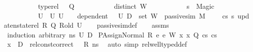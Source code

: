 \begin{isabellebody}
\ \ \ \ \ \ \ \ \ \ {\isachardoublequoteopen}type{\isacharunderscore}{\kern0pt}rel\ {\isasymLambda}\ {\isasymLambda}{\isacharprime}{\kern0pt}\ Q{\isachardoublequoteclose}\ \isanewline
\ \ \ \ \ \ \ \ \ \ {\isachardoublequoteopen}distinct\ W{\isachardoublequoteclose}\ \isanewline
\ \ \ \ \ \ \ \ \ \ {\isachardoublequoteopen}s{\isacharprime}{\kern0pt}\ {\isasymnoteq}\ Magic{\isachardoublequoteclose}\isanewline
\ \ \ \ \ \ \ \ \ {\isachardoublequoteopen}{\isasymexists}\ U{}\ {\isasymsubseteq}\ U{}{\isachardot}{\kern0pt}\ U{}\ {\isasymnoteq}\ {\isacharbraceleft}{\kern0pt}{\isacharbraceright}{\kern0pt}\ {\isasymand}\ dependent\ {\isasymLambda}{\isacharprime}{\kern0pt}\ {\isasymOmega}\ U{}\ {\isacharparenleft}{\kern0pt}D{}\ {\isasymunion}\ {\isacharparenleft}{\kern0pt}set\ W{\isacharparenright}{\kern0pt}{\isacharparenright}{\kern0pt}\ {\isasymand}\ passive{\isacharunderscore}{\kern0pt}sim\ M\ {\isasymLambda}\ {\isasymLambda}{\isacharprime}{\kern0pt}\ {\isasymGamma}\ {\isasymOmega}\ cs{}\ s{\isacharprime}{\kern0pt}\ {\isacharparenleft}{\kern0pt}update{\isacharunderscore}{\kern0pt}nstate{\isacharunderscore}{\kern0pt}rel\ R\ Q{\isacharparenright}{\kern0pt}\ R{\isacharunderscore}{\kern0pt}old\ U{}{\isachardoublequoteclose}\isanewline
%
\isadelimproof
\ \ %
\endisadelimproof
%
\isatagproof
{}\isamarkupfalse%
\ passive{\isacharunderscore}{\kern0pt}sim{\isacharunderscore}{\kern0pt}def\isanewline
\ \ \isamarkupfalse%
\ assms\isanewline
{}\isamarkupfalse%
\ {\isacharparenleft}{\kern0pt}induction\ arbitrary{\isacharcolon}{\kern0pt}\ ns\ U{}\ D{}{\isacharparenright}{\kern0pt}\isanewline
{}\isamarkupfalse%
\ {\isacharparenleft}{\kern0pt}PAssignNormal\ R\ e{}\ e{}\ W\ x{}\ x{}\ Q\ cs{}\ cs{}{\isacharparenright}{\kern0pt}\ \ \isanewline
\ \ \isamarkupfalse%
\ {\isachardoublequoteopen}x{}\ {\isasymnotin}\ D{}{\isachardoublequoteclose}\ \ {\isachardoublequoteopen}rel{\isacharunderscore}{\kern0pt}const{\isacharunderscore}{\kern0pt}correct\ {\isasymLambda}\ {\isasymOmega}\ R\ ns{\isachardoublequoteclose}\ \isamarkupfalse%
\ {\isacharparenleft}{\kern0pt}auto\ simp{\isacharcolon}{\kern0pt}\ rel{\isacharunderscore}{\kern0pt}well{\isacharunderscore}{\kern0pt}typed{\isacharunderscore}{\kern0pt}def{\isacharparenright}{\kern0pt}\isanewline

\end{isabellebody}

